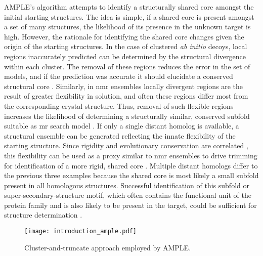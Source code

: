 AMPLE's algorithm attempts to identify a structurally shared core amongst the initial starting structures. The idea is simple, if a shared core is present amongst a set of many structures, the likelihood of its presence in the unknown target is high. However, the rationale for identifying the shared core changes given the origin of the starting structures. In the case of clustered \textit{ab initio} decoys, local regions inaccurately predicted can be determined by the structural divergence within each cluster. The removal of these regions reduces the error in the set of models, and if the prediction was accurate it should elucidate a conserved structural core \cite{Bibby2012-lm}. Similarly, in \gls{nmr} ensembles locally divergent regions are the result of greater flexibility in solution, and often these regions differ most from the corresponding crystal structure. Thus, removal of such flexible regions increases the likelihood of determining a structurally similar, conserved subfold suitable as \gls{mr} search model \cite{Bibby2013-cp}. If only a single distant homolog is available, a structural ensemble can be generated reflecting the innate flexibility of the starting structure. Since rigidity and evolutionary conservation are correlated \cite{Yeh2014-vl, Shih2012-gh}, this flexibility can be used as a proxy similar to \gls{nmr} ensembles to drive trimming for identification of a more rigid, shared core \cite{Rigden2018-zt}. Multiple distant homologs differ to the previous three examples because the shared core is most likely a small subfold present in all homologous structures. Successful identification of this subfold or super-secondary-structure motif, which often contains the functional unit of the protein family and is also likely to be present in the target, could be sufficient for structure determination \cite{Bruhn2014-aa,Hotta2014-me}. 

\begin{figure}[H]
    \centering
    \texttt{[image: introduction\_ample.pdf]}
    \caption{Cluster-and-truncate approach employed by AMPLE.}
    \label{fig:introduction_ample}
\end{figure}

